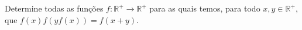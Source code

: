 Determine todas as funções \(f\colon \mathbb{R}^+\to\mathbb{R}^+\) para as quais temos, para todo \(x,y\in \mathbb{R}^+\), que \(f(x)f(yf(x))=f(x+y)\).
